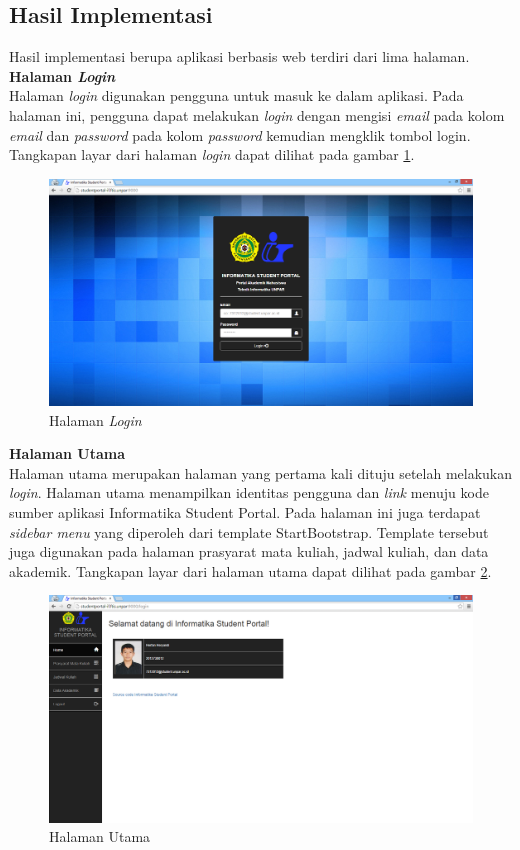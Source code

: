 \subsection{Hasil Implementasi}
				Hasil implementasi berupa aplikasi berbasis web terdiri dari lima halaman. 
				\textbf{Halaman \textit{Login}}\\
				Halaman \textit{login} digunakan pengguna untuk masuk ke dalam aplikasi. Pada halaman ini, pengguna dapat melakukan \textit{login} dengan mengisi \textit{email} pada kolom \textit{email} dan \textit{password} pada kolom \textit{password} kemudian mengklik tombol login. Tangkapan layar dari halaman \textit{login} dapat dilihat pada gambar \ref{fig:5_hasil_login}.
					\begin{figure}[H]
						\centering
						\includegraphics[scale=0.5]{Gambar/hasil_login}
						\caption{Halaman \textit{Login}} 
						\label{fig:5_hasil_login}
					\end{figure}
					
				\textbf{Halaman Utama}\\
				Halaman utama merupakan halaman yang pertama kali dituju setelah melakukan \textit{login}. Halaman utama menampilkan identitas pengguna dan \textit{link} menuju kode sumber aplikasi Informatika Student Portal. Pada halaman ini juga terdapat \textit{sidebar menu} yang diperoleh dari template StartBootstrap. Template tersebut juga digunakan pada halaman prasyarat mata kuliah, jadwal kuliah, dan data akademik. Tangkapan layar dari halaman utama dapat dilihat pada gambar \ref{fig:5_hasil_utama}.
					\begin{figure}[H]
						\centering
						\includegraphics[scale=0.5]{Gambar/hasil_home}
						\caption{Halaman Utama} 
						\label{fig:5_hasil_utama}
					\end{figure}
						
